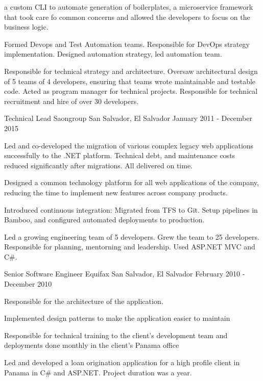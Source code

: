 \begin{cventries}
{\begin{cvitems}
{          a custom CLI to automate generation of boilerplates, a microservice
          framework that took care fo common concerns and allowed the developers
          to focus on the business logic.
        }
        \item {
          Formed Devops and Test Automation teams. Responsible for DevOps
          strategy implementation. Designed automation strategy, led automation team.
        }
      \end{cvitems}
    }
    {
      \begin{cventrysummary} %
        Responsible for technical strategy and architecture. Oversaw
        architectural design of 5 teams of 4 developers, ensuring that teams
        wrote maintainable and testable code. Acted as program
        manager for technical projects. Responsible for technical recruitment
        and hire of over 30 developers.
      \end{cventrysummary}
    }

  \cventry
    {Technical Lead} %
    {Saongroup}
    {San Salvador, El Salvador}
    {January 2011 - December 2015} %
    {
      \begin{cvitems}
        \item {Led and co-developed the migration of various complex legacy web applications successfully to the .NET platform. Technical debt, and maintenance costs reduced significantly after migrations. All delivered on time.}
        \item {Designed a common technology platform for all web applications of the company, reducing the time to implement new features across company products.}
        \item {Introduced continuous integration: Migrated from TFS to Git. Setup pipelines in Bamboo, and configured automated deployments to production.}
      \end{cvitems}
    }
    {Led a growing engineering team of 5 developers. Grew the team to 25 developers. Responsible for planning, mentorning and leadership. Used ASP.NET MVC and C\#.}

  \cventry
    {Senior Software Engineer} %
    {Equifax} %
    {San Salvador, El Salvador} %
    {February 2010 - December 2010} %
    {
      \begin{cvitems} %
        \item {Responsible for the architecture of the application.}
        \item {Implemented design patterns to make the application easier to maintain}
        \item {Responsible for technical training to the client’s development team and deployments done monthly in the client’s Panama office}
      \end{cvitems}
    }
    {Led and developed a loan origination application for a high profile client in Panama in C\# and ASP.NET. Project duration was a year.}


\end{cventries}
